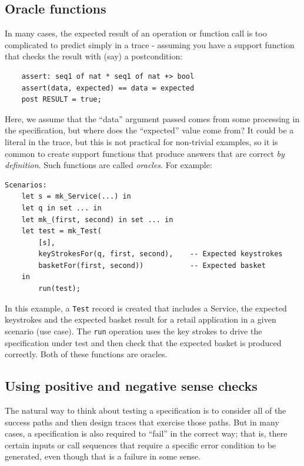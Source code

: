 \documentclass{overturerepchap}
\begin{document}
\subsection{Oracle functions}

In many cases, the expected result of an operation or function call is too
complicated to predict simply in a trace - assuming you have a support function
that checks the result with (say) a postcondition:

\scriptsize
\begin{lstlisting}
    assert: seq1 of nat * seq1 of nat +> bool
    assert(data, expected) == data = expected
    post RESULT = true;
\end{lstlisting}
\normalsize

Here, we assume that the ``data'' argument passed comes from some processing in
the specification, but where does the ``expected'' value come from? It could be
a literal in the trace, but this is not practical for non-trivial examples, so
it is common to create support functions that produce answers that are correct
\emph{by definition}. Such functions are called \emph{oracles}. For example:

\scriptsize
\begin{lstlisting}
Scenarios:
    let s = mk_Service(...) in
    let q in set ... in
    let mk_(first, second) in set ... in 
    let test = mk_Test(
        [s],
        keyStrokesFor(q, first, second),    -- Expected keystrokes
        basketFor(first, second))           -- Expected basket
    in
        run(test);
\end{lstlisting}
\normalsize

In this example, a \texttt{Test} record is created that includes a Service, the
expected keystrokes and the expected basket result for a retail application in
a given scenario (use case). The \texttt{run} operation uses the key strokes to
drive the specification under test and then check that the expected basket is
produced correctly. Both of these functions are oracles.

\subsection{Using positive and negative sense checks}

The natural way to think about testing a specification is to consider all of the
success paths and then design traces that exercise those paths. But in many
cases, a specification is also required to ``fail'' in the correct way; that is,
there certain inputs or call sequences that require a specific error condition
to be generated, even though that is a failure in some sense.
\end{document}
